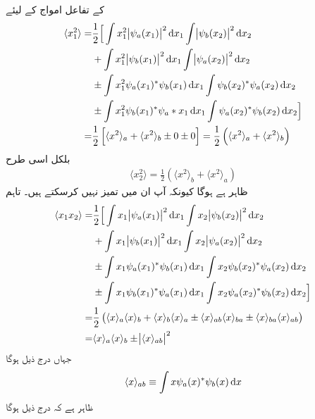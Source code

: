   کے تفاعل امواج کے لیئے 
\begin{gather*}
	\begin{aligned}
		\langle x_1^2 \rangle =& \frac{1}{2}\Big[\int x_1^2\abs{\psi_a(x_1)}^2\dif x_1\int\abs{\psi_b(x_2)}^2\dif x_2 \\
		&+ \int x_1^2\abs{\psi_b(x_1)}^2\dif x_1\int\abs{\psi_a(x_2)}^2\dif x_2 \\
		&\pm\int x_1^2\psi_a(x_1)^*\psi_b(x_1)\dif x_1\int\psi_b(x_2)^*\psi_a(x_2)\dif x_2 \\
		&\pm\int x_1^2\psi_b(x_1)^*\psi_a*x_1\dif x_1\int\psi_a(x_2)^*\psi_b(x_2)\dif x_2\Big] \\
		=& \frac{1}{2}\left[\langle x^2 \rangle_a+\langle x^2 \rangle_b\pm0\pm0\right]=\frac{1}{2}\left(\langle x^2 \rangle_a+\langle x^2\rangle_b\right)
	\end{aligned}
\end{gather*}
بلکل اسی طرح
\begin{align*}
	\langle x_2^2 \rangle=\frac{1}{2}\left(\langle x^2 \rangle_b+\langle x^2 \rangle_a\right)
\end{align*}
ظاہر ہے  ہوگا کیونکہ آپ ان میں تمیز نہیں کرسکتے ہیں۔ تاہم
\begin{gather*}
	\begin{aligned}
		\langle x_1x_2 \rangle=&\frac{1}{2}\Big[\int x_1\abs{\psi_a(x_1)}^2\dif x_1\int x_2\abs{\psi_b(x_2)}^2\dif x_2 \\
		&+\int x_1\abs{\psi_b(x_1)}^2\dif x_1\int x_2\abs{\psi_a(x_2)}^2\dif x_2 \\
		&\pm\int x_1\psi_a(x_1)^*\psi_b(x_1)\dif x_1\int x_2\psi_b(x_2)^*\psi_a(x_2)\dif x_2 \\
		&\pm\int x_1\psi_b(x_1)^*\psi_a(x_1)\dif x_1\int x_2\psi_a(x_2)^*\psi_b(x_2)\dif x_2\Big] \\
		=& \frac{1}{2}\left(\langle x \rangle_a\langle x \rangle_b+\langle x \rangle_b\langle x \rangle_a\pm\langle x \rangle_{ab}\langle x \rangle_{ba}\pm\langle x \rangle_{ba}\langle x \rangle_{ab}\right)\\
		=&\langle x \rangle_a\langle x \rangle_b\pm\abs{\langle x \rangle_{ab}}^2
	\end{aligned}
\end{gather*}
جہاں درج ذیل ہوگا
\begin{align}
	\langle x \rangle_{ab}\equiv\int x\psi_a(x)^*\psi_b(x)\dif x
\end{align}
ظاہر ہے کہ درج ذیل ہوگا
